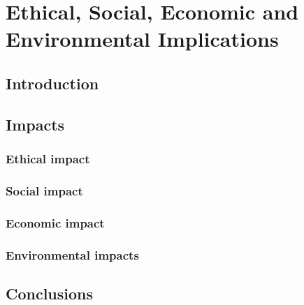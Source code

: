 \chapter{Ethical, Social, Economic and Environmental Implications}


\section{Introduction}

\section{Impacts}

\subsection{Ethical impact}

\subsection{Social impact}

\subsection{Economic impact}

\subsection{Environmental impacts}

\section{Conclusions}

\clearpage
\newpage